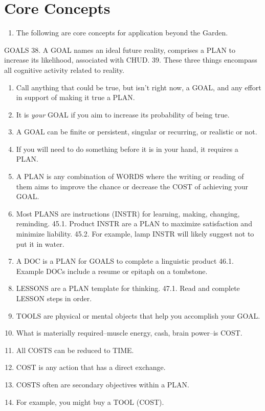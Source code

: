 \documentclass[
]{book}
\providecommand{\tightlist}{%
  \setlength{\itemsep}{0pt}\setlength{\parskip}{0pt}}
\begin{document}
\hypertarget{core-concepts}{%
\section{Core Concepts}\label{core-concepts}}

\begin{enumerate}
\def\labelenumi{\arabic{enumi}.}
\setcounter{enumi}{36}
\tightlist
\item
  The following are core concepts for application beyond the Garden.
\end{enumerate}

GOALS
38. A GOAL names an ideal future reality, comprises a PLAN to increase its
likelihood, associated with CHUD.
39. These three things encompass all cognitive activity related to reality.

\begin{enumerate}
\def\labelenumi{\arabic{enumi}.}
\setcounter{enumi}{39}
\item
  Call anything that could be true, but isn't right now, a GOAL, and any effort in support of making it true a PLAN.
\item
  It is \emph{your} GOAL if you aim to increase its probability of being true.
\item
  A GOAL can be finite or persistent, singular or recurring, or realistic or not.
\item
  If you will need to do something before it is in your hand, it requires a PLAN.
\item
  A PLAN is any combination of WORDS where the writing or reading of them aims
  to improve the chance or decrease the COST of achieving your GOAL.
\item
  Most PLANS are instructions (INSTR) for learning, making, changing, reminding.
  45.1. Product INSTR are a PLAN to maximize satisfaction and minimize liability.
  45.2. For example, lamp INSTR will likely suggest not to put it in water.
\item
  A DOC is a PLAN for GOALS to complete a linguistic product
  46.1. Example DOCs include a resume or epitaph on a tombstone.
\item
  LESSONS are a PLAN template for thinking.
  47.1. Read and complete LESSON steps in order.
\item
  TOOLS are physical or mental objects that help you accomplish your GOAL.
\item
  What is materially required--muscle energy, cash, brain power--is COST.
\item
  All COSTS can be reduced to TIME.
\item
  COST is any action that has a direct exchange.
\item
  COSTS often are secondary objectives within a PLAN.
\item
  For example, you might buy a TOOL (COST).
\end{enumerate}
\end{document}
